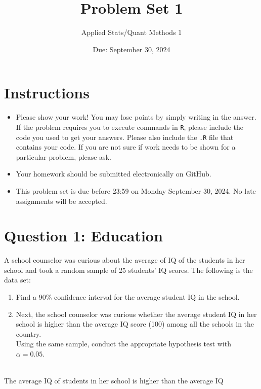 \documentclass[12pt,letterpaper]{article}
\title{Problem Set 1}
\date{Due: September 30, 2024}
\author{Applied Stats/Quant Methods 1}
\begin{document}
	\maketitle
	
	\section*{Instructions}
	\begin{itemize}
	\item Please show your work! You may lose points by simply writing in the answer. If the problem requires you to execute commands in \texttt{R}, please include the code you used to get your answers. Please also include the \texttt{.R} file that contains your code. If you are not sure if work needs to be shown for a particular problem, please ask.
\item Your homework should be submitted electronically on GitHub.
\item This problem set is due before 23:59 on Monday September 30, 2024. No late assignments will be accepted.
	\end{itemize}
	
	\vspace{1cm}
	\section*{Question 1: Education}

A school counselor was curious about the average of IQ of the students in her school and took a random sample of 25 students' IQ scores. The following is the data set:\\

\begin{enumerate}
	\item Find a 90\% confidence interval for the average student IQ in the school.
     
	\item Next, the school counselor was curious  whether  the average student IQ in her school is higher than the average IQ score (100) among all the schools in the country.\\ 
	\noindent Using the same sample, conduct the appropriate hypothesis test with $\alpha=0.05$.
		  
\end{enumerate}
            \\The average IQ of students in her school is higher than the average IQ\\
\newpage
\end{document}
